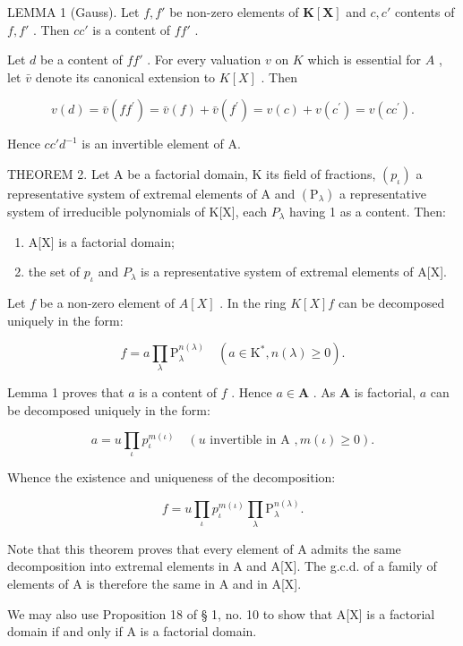 LEMMA 1 (Gauss). Let \(f, f'\) be non-zero elements of \(\mathbf{K}[\mathbf{X}]\) and \(c, c'\) contents of \(f, f'\) . Then \(cc'\) is a content of \(ff'\) .

Let \(d\) be a content of \(ff'\) . For every valuation \(v\) on \(K\) which is essential for \(A\) , let \(\bar{v}\) denote its canonical extension to \(K[X]\) . Then

\[
v (d) = \bar {v} (f f ^ {\prime}) = \bar {v} (f) + \bar {v} (f ^ {\prime}) = v (c) + v (c ^ {\prime}) = v (c c ^ {\prime}).
\]

Hence \(cc'd^{-1}\) is an invertible element of A.

THEOREM 2. Let A be a factorial domain, K its field of fractions, \((p_{\iota})\) a representative system of extremal elements of A and \((\mathrm{P}_{\lambda})\) a representative system of irreducible polynomials of K{[}X{]}, each \(P_{\lambda}\) having 1 as a content. Then:

\begin{enumerate}
\def\labelenumi{(\roman{enumi})}
\item
  A{[}X{]} is a factorial domain;
\item
  the set of \(p_{\iota}\) and \(P_{\lambda}\) is a representative system of extremal elements of A{[}X{]}.
\end{enumerate}

Let \(f\) be a non-zero element of \(A[X]\) . In the ring \(K[X]f\) can be decomposed uniquely in the form:

\[
f = a \prod_ {\lambda} \mathrm{P} _ {\lambda} ^ {n (\lambda)} \quad (a \in \mathrm{K} ^ {*}, n (\lambda) \geqslant 0).
\]

Lemma 1 proves that \(a\) is a content of \(f\) . Hence \(a \in \mathbf{A}\) . As \(\mathbf{A}\) is factorial, \(a\) can be decomposed uniquely in the form:

\[
a = u \prod_ {\iota} p _ {\iota} ^ {m (\iota)} \quad (u \text {   invertible   in   A }, m (\iota) \geqslant 0).
\]

Whence the existence and uniqueness of the decomposition:

\[
f = u \prod_ {\iota} p _ {\iota} ^ {m (\iota)} \prod_ {\lambda} \mathrm{P} _ {\lambda} ^ {n (\lambda)}.
\]

Note that this theorem proves that every element of A admits the same decomposition into extremal elements in A and A{[}X{]}. The g.c.d. of a family of elements of A is therefore the same in A and in A{[}X{]}.

We may also use Proposition 18 of § 1, no. 10 to show that A{[}X{]} is a factorial domain if and only if A is a factorial domain.

